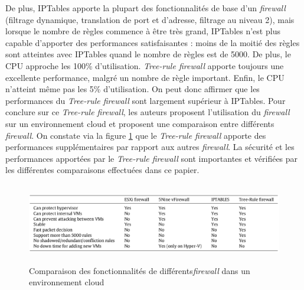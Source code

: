 De plus, IPTables apporte la plupart des fonctionnalités de base d'un \textit{firewall} (filtrage dynamique, translation de port et d'adresse, filtrage au niveau 2), mais lorsque le nombre de règles commence à être très grand, IPTables n'est plus capable d'apporter des performances satisfaisantes : moins de la moitié des règles sont atteintes avec IPTables quand le nombre de règles est de 5000. De plus, le CPU approche les 100\% d'utilisation. \textit{Tree-rule firewall} apporte toujours une excellente performance, malgré un nombre de règle important. Enfin, le CPU n'atteint même pas les 5\% d'utilisation. On peut donc affirmer que les performances du \textit{Tree-rule firewall} sont largement supérieur à IPTables. 
\newline
Pour conclure sur ce \textit{Tree-rule firewall}, les auteurs proposent  l'utilisation du \textit{firewall} sur un environnement cloud et proposent une comparaison entre différents \textit{firewall}. On constate via la figure \ref{label-image11} que le \textit{Tree-rule firewall} apporte des performances supplémentaires par rapport aux autres \textit{firewall}. La sécurité et les performances apportées par le \textit{Tree-rule firewall} sont importantes et vérifiées par les différentes comparaisons effectuées dans ce papier.

\begin{figure}[h]
	\center
	\includegraphics[height=3.5cm,width=15cm]{./pics/comparatif_firewall.png}
	\caption{Comparaison des fonctionnalités de différents\textit{firewall} dans un environnement cloud \cite{tree_rule_firewall}}
	\label{label-image11}
\end{figure}
